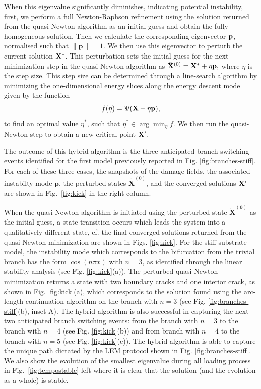 \documentclass[10pt]{article}
\begin{document}
When this eigenvalue significantly diminishes, indicating potential instability, first, we perform a full Newton-Raphson refinement using the solution returned from the quasi-Newton algorithm as an initial guess and obtain the fully homogeneous solution. Then we calculate the corresponding eigenvector \(\mathbf{p}\), normalised such that $\|\textbf{p}\|=1$.
We then use this eigenvector to perturb the current solution $\mathbf{X^*}$. This perturbation sets the initial guess for the next minimization step in the quasi-Newton algorithm as $\mathbf{\tilde X}^{(0)} = \mathbf{X^*} + \eta \mathbf{p},
$ where \(\eta\) is the step size.
%
%
This step size can be determined through a line-search algorithm by minimizing the one-dimensional energy slices along the energy descent mode given by the function
\begin{equation}
    f(\eta) = \Psi(\mathbf{X} + \eta \mathbf{p}),
    \label{eqn:energy-slice}
\end{equation}
to find an optimal value \(\eta^*\), such that $\eta^* \in \arg \min_{\eta} f$. {We then run the quasi-Newton step to obtain a new critical point $\mathbf{X}'$.}

The outcome of this hybrid algorithm is the three anticipated branch-switching events identified for the first model previously reported in Fig. \ref{fig:branches-stiff}. For each of these three cases, the snapshots of the damage fields, the associated {instabilty mode} \(\mathbf{p}\), the perturbed states \(\mathbf{\tilde X}^{(0)}\), and the converged solutions $\mathbf{X}'$ are shown in Fig.~\ref{fig:kick} in the right column.

When the quasi-Newton algorithm is initiated using the perturbed state \(\mathbf{\tilde X^{(0)}}\) as the initial guess, {a state transition} occurs which leads the system into a qualitatively different state, cf. the final  converged solutions returned from the quasi-Newton minimization are shown in  Figs. \ref{fig:kick}. For the stiff substrate model, the {instability mode} which corresponds to the bifurcation from the trivial branch has the form \(\cos(n\pi x)\) with \(n=3\), as identified through the linear stability analysis (see Fig. {\ref{fig:kick}(a))}.
The perturbed quasi-Newton minimization returns a state with two boundary cracks and one interior crack, as shown in Fig. {\ref{fig:kick}(a)}, which corresponds to the solution found using the arc-length continuation algorithm on the branch with \(n=3\) (see Fig. \ref{fig:branches-stiff}(b), inset A).  The hybrid algorithm is also successful in capturing the next two anticipated branch   switching events: from the  branch with \(n=3\)  to the branch  with \(n=4\) \textcolor{black}{(see Fig. \ref{fig:kick}(b))} and  from branch with \(n=4\)  to the branch  with \(n=5\) {(see Fig. \ref{fig:kick}(c))}. The hybrid algorithm is able to capture the unique path dictated by the LEM protocol shown in Fig. \ref{fig:branches-stiff}. {We also show the evolution of the smallest eigenvalue during all loading process in Fig.~\ref{fig:tempostable}-left where  it is clear that  the solution (and the evolution as a whole) is stable.}
\end{document}
